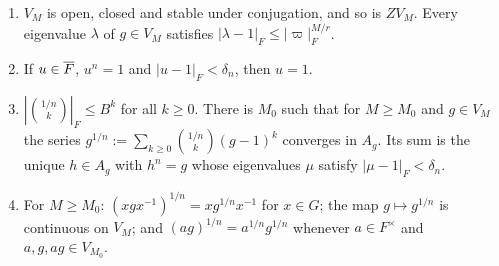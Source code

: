 \begin{lemma}\label{II:lem:roots}
\begin{enumerate}[label=(\alph*)]
\item $V_M$ is open, closed and stable under conjugation, and so is $ZV_M$. Every eigenvalue $\lambda$ of $g\in V_M$ satisfies $|\lambda-1|_F\le|\varpi|_F^{M/r}$.
\item If $u\in\overline{F}$, $u^n=1$ and $|u-1|_F<\delta_n$, then $u=1$.
\item $|\binom{1/n}{k}|_F\le B^k$ for all $k\ge0$. There is $M_0$ such that for $M\ge M_0$ and $g\in V_M$ the series $g^{1/n}:=\sum_{k\ge0}\binom{1/n}{k}(g-1)^k$ converges in $A_g$. Its sum is the unique $h\in A_g$ with $h^n=g$ whose eigenvalues $\mu$ satisfy $|\mu-1|_F<\delta_n$.
\item For $M\ge M_0$: $(xgx^{-1})^{1/n}=xg^{1/n}x^{-1}$ for $x\in G$; the map $g\mapsto g^{1/n}$ is continuous on $V_M$; and $(ag)^{1/n}=a^{1/n}g^{1/n}$ whenever $a\in F^\times$ and $a,g,ag\in V_{M_0}$.
\end{enumerate}
\end{lemma}
